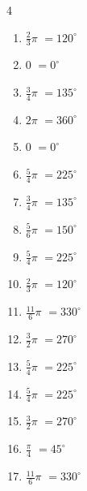 \begin{multicols}{4}
\begin{enumerate}
  \item $\displaystyle \frac{2}{3}\pi$
        $\displaystyle =120^{\circ}$

  \item $\displaystyle 0$
        $\displaystyle =0^{\circ}$

  \item $\displaystyle \frac{3}{4}\pi$
        $\displaystyle =135^{\circ}$

  \item $\displaystyle 2\pi$
        $\displaystyle =360^{\circ}$

  \item $\displaystyle 0$
        $\displaystyle =0^{\circ}$

  \item $\displaystyle \frac{5}{4}\pi$
        $\displaystyle =225^{\circ}$

  \item $\displaystyle \frac{3}{4}\pi$
        $\displaystyle =135^{\circ}$

  \item $\displaystyle \frac{5}{6}\pi$
        $\displaystyle =150^{\circ}$

  \item $\displaystyle \frac{5}{4}\pi$
        $\displaystyle =225^{\circ}$

  \item $\displaystyle \frac{2}{3}\pi$
        $\displaystyle =120^{\circ}$

  \item $\displaystyle \frac{11}{6}\pi$
        $\displaystyle =330^{\circ}$

  \item $\displaystyle \frac{3}{2}\pi$
        $\displaystyle =270^{\circ}$

  \item $\displaystyle \frac{5}{4}\pi$
        $\displaystyle =225^{\circ}$

  \item $\displaystyle \frac{5}{4}\pi$
        $\displaystyle =225^{\circ}$

  \item $\displaystyle \frac{3}{2}\pi$
        $\displaystyle =270^{\circ}$

  \item $\displaystyle \frac{\pi}{4}$
        $\displaystyle =45^{\circ}$

\columnbreak %

\resetques

  \item $\displaystyle \frac{11}{6}\pi$
        $\displaystyle =330^{\circ}$


\end{enumerate}
\end{multicols}
